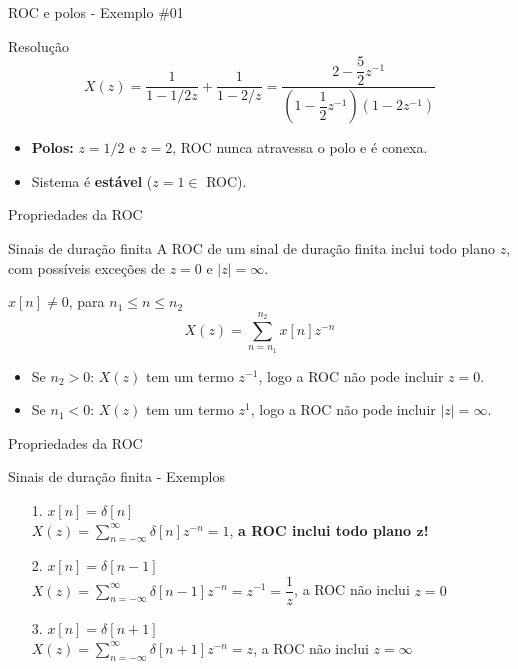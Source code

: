 \begin{frame}{ROC e polos - Exemplo \#01}
\begin{block}{Resolução}
	\[ X(z)=\dfrac{1}{1-1/2z}+\dfrac{1}{1-2/z}=\dfrac{2-\dfrac{5}{2}z^{-1}}{\left(1-\dfrac{1}{2}z^{-1} \right)\left(1-2z^{-1} \right)  } \]
	
	\begin{itemize}
		\item \textbf{Polos:} $ z=1/2 $ e $ z=2 $, ROC nunca atravessa o polo e é conexa.
		\item Sistema é \textbf{estável} ($ z=1 \in $ ROC).
	\end{itemize}
\end{block}
\end{frame}

\begin{frame}{Propriedades da ROC}
\begin{block}{Sinais de duração finita}
	A ROC de um sinal de duração finita inclui todo plano $z$, com possíveis exceções de $ z = 0 $ e $ |z| = \infty $.\\
	\begin{center}
		$ x[n] \neq 0 $, para $n_1 \leqslant n \leqslant n_2 $\\
		$$ X(z) = \sum_{n = n_1}^{n_2}x[n]z^{-n} $$
	\end{center}
	\begin{itemize}
		\item Se $ n_2 > 0 $: $ X(z) $ tem um termo $ z^{-1} $, logo a ROC não pode incluir $ z = 0 $.
		\item Se $ n_1 < 0 $: $ X(z) $ tem um termo $ z^{1} $, logo a ROC não pode incluir $ |z| = \infty $.
	\end{itemize}
\end{block}
\end{frame}

\begin{frame}{Propriedades da ROC}
\begin{block}{Sinais de duração finita - Exemplos}
	\begin{itemize}
		\item [1.] $ x[n] = \delta[n] $\\
		\vspace{0,1 cm}
		$ X(z) = \sum_{n=-\infty}^{\infty} \delta[n]z^{-n} = 1 $, \textbf{a ROC inclui todo plano $\bm{z}$!}\\
		\vspace{0,2 cm}
		\item [2.] $ x[n] = \delta[n - 1] $\\
		\vspace{0,1 cm}
		$ X(z) = \sum_{n=-\infty}^{\infty} \delta[n - 1]z^{-n} = z^{-1} = \dfrac{1}{z} $, a ROC não inclui $z=0$\\
		\vspace{0,2 cm}
		\item [3.] $ x[n] = \delta[n + 1] $\\
		\vspace{0,1 cm}
		$ X(z) = \sum_{n=-\infty}^{\infty} \delta[n + 1]z^{-n} = z $, a ROC não inclui $z = \infty$
	\end{itemize}
\end{block}
\end{frame}

